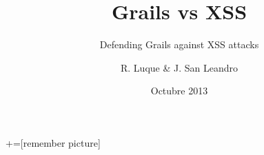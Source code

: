 \documentclass{beamer}
\title{Grails vs XSS}
\subtitle{Defending Grails against XSS attacks}
\author{R. Luque \& J. San Leandro}
\institute{%
  \href{http://twitter.com/rafael_luque}{@rafael\_luque} - \href{http://osoco.es}{Osoco}
  \hskip20pt
  \href{http://twitter.com/rydnr}{@rydnr} - \href{http://www.ventura24.es}{Ventura24}
}
\date[10/2013]{Octubre 2013}
\begin{document}
+=[remember picture]













\end{document}
